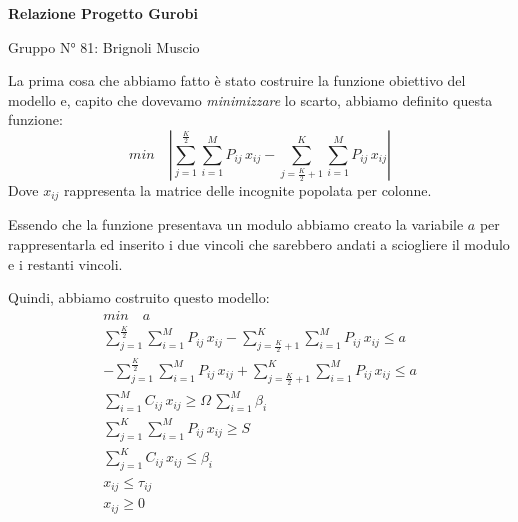 \documentclass[11pt]{article}
\begin{document}
  \begin{center}
    \Large\textbf{Relazione Progetto Gurobi}

    \small Gruppo N° 81: Brignoli Muscio
  \end{center}\bigskip

  La prima cosa che abbiamo fatto è stato costruire la funzione obiettivo del modello e, capito che dovevamo \textit{minimizzare} lo scarto, abbiamo definito questa funzione:
  \begin{equation*}
    min\quad\left|\sum_{j=1}^{\frac{K}{2}}\sum_{i=1}^{M}P_{ij}\,x_{ij}-\sum_{j=\frac{K}{2}+1}^{K}\sum_{i=1}^{M}P_{ij}\,x_{ij}\right|
  \end{equation*}
  Dove $x_{ij}$ rappresenta la matrice delle incognite popolata per colonne.

  Essendo che la funzione presentava un modulo abbiamo creato la variabile $a$ per rappresentarla ed inserito i due vincoli che sarebbero andati a sciogliere il modulo e i restanti vincoli.

  Quindi, abbiamo costruito questo modello:
  \begin{gather*}
    min\quad a \\
    \sum_{j=1}^{\frac{K}{2}}\sum_{i=1}^{M}P_{ij}\,x_{ij}-\sum_{j=\frac{K}{2}+1}^{K}\sum_{i=1}^{M}P_{ij}\,x_{ij}\leq a \\
    -\sum_{j=1}^{\frac{K}{2}}\sum_{i=1}^{M}P_{ij}\,x_{ij}+\sum_{j=\frac{K}{2}+1}^{K}\sum_{i=1}^{M}P_{ij}\,x_{ij}\leq a \\
    \sum_{i=1}^M C_{ij}\,x_{ij}\geq \Omega\,\sum_{i=1}^M\beta_i \\
    \sum_{j=1}^{K}\sum_{i=1}^{M} P_{ij}\,x_{ij}\geq S \\
    \sum_{j=1}^K C_{ij}\,x_{ij}\leq \beta_i \\
    x_{ij}\leq \tau_{ij} \\
    x_{ij}\geq 0
  \end{gather*}
\end{document}
